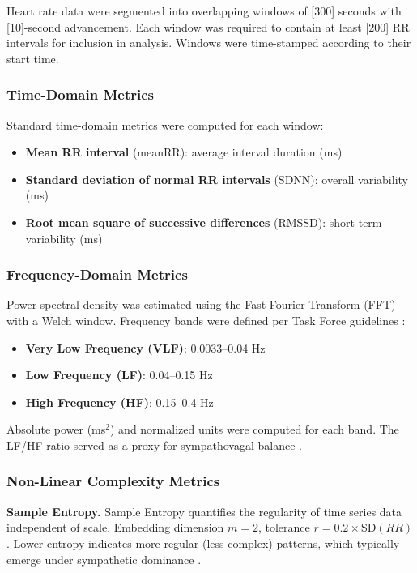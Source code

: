 \documentclass[12pt,a4paper]{article}
\begin{document}
Heart rate data were segmented into overlapping windows of [300] seconds with [10]-second advancement. Each window was required to contain at least [200] RR intervals for inclusion in analysis. Windows were time-stamped according to their start time.

\subsubsection*{Time-Domain Metrics}

Standard time-domain metrics were computed for each window:
\begin{itemize}
    \item \textbf{Mean RR interval} (meanRR): average interval duration (ms)
    \item \textbf{Standard deviation of normal RR intervals} (SDNN): overall variability (ms)
    \item \textbf{Root mean square of successive differences} (RMSSD): short-term variability (ms)
\end{itemize}

\subsubsection*{Frequency-Domain Metrics}

Power spectral density was estimated using the Fast Fourier Transform (FFT) with a Welch window. Frequency bands were defined per Task Force guidelines \cite{TaskForce1996}:
\begin{itemize}
    \item \textbf{Very Low Frequency (VLF)}: 0.0033--0.04 Hz
    \item \textbf{Low Frequency (LF)}: 0.04--0.15 Hz
    \item \textbf{High Frequency (HF)}: 0.15--0.4 Hz
\end{itemize}

Absolute power (ms$^2$) and normalized units were computed for each band. The LF/HF ratio served as a proxy for sympathovagal balance \cite{Pagani1997}.

\subsubsection*{Non-Linear Complexity Metrics}

\textbf{Sample Entropy.} Sample Entropy quantifies the regularity of time series data independent of scale. Embedding dimension $m = 2$, tolerance $r = 0.2 \times \text{SD}(RR)$. Lower entropy indicates more regular (less complex) patterns, which typically emerge under sympathetic dominance \cite{Richman2000}.
\end{document}
